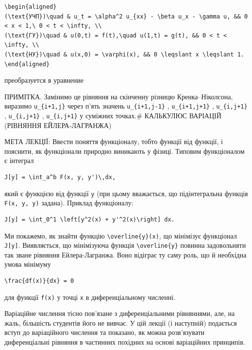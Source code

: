 \documentclass[
  ukrainian,
]{article}
\begin{document}
\begin{verbatim}
\begin{aligned}
(\text{УЧП})\quad & u_t = \alpha^2 u_{xx} - \beta u_x - \gamma u, && 0 < x < 1,\ 0 < t < \infty, \\
(\text{ГУ})\quad & u(0,t) = f(t),\quad u(1,t) = g(t), && 0 < t < \infty, \\
(\text{НУ})\quad & u(x,0) = \varphi(x), && 0 \leqslant x \leqslant 1.
\end{aligned}
\end{verbatim}

преобразуется в уравнение

ПРИМІТКА. Замінимо це рівняння на скінченну різницю Кренка--Ніколсона,
виразимо \texttt{u\_\{i+1,j\}} через п'ять значень
\texttt{u\_\{i+1,j-1\}} , \texttt{u\_\{i+1,j+1\}} ,
\texttt{u\_\{i,j+1\}} , \texttt{u\_\{i,j+1\}} , \texttt{u\_\{i,j+1\}} у
суміжних точках.\# КАЛЬКУЛЮС ВАРІАЦІЙ (РІВНЯННЯ ЕЙЛЕРА-ЛАГРАНЖА)

МЕТА ЛЕКЦІЇ: Ввести поняття функціоналу, тобто функції від функції, і
пояснити, як функціонали природно виникають у фізиці. Типовим
функціоналом є інтеграл

\begin{verbatim}
J[y] = \int_a^b F(x, y, y')\,dx,
\end{verbatim}

який є функцією від функції \texttt{y} (при цьому вважається, що
підінтегральна функція \texttt{F(x,\ y,\ y\textquotesingle{})} задана).
Приклад функціоналу:

\begin{verbatim}
J[y] = \int_0^1 \left[y^2(x) + y'^2(x)\right] dx.
\end{verbatim}

Ми покажемо, як знайти функцію
\texttt{\textbackslash{}overline\{y\}(x)}, що мінімізує функціонал
\texttt{J{[}y{]}}. Виявляється, що мінімізуюча функція
\texttt{\textbackslash{}overline\{y\}} повинна задовольняти так зване
рівняння Ейлера-Лагранжа. Воно відіграє ту саму роль, що й необхідна
умова мінімуму

\begin{verbatim}
\frac{df(x)}{dx} = 0
\end{verbatim}

для функції \texttt{f(x)} у точці \texttt{x} в диференціальному
численні.

Варіаційне числення тісно пов'язане з диференціальними рівняннями, але,
на жаль, більшість студентів його не вивчає. У цій лекції (і наступній)
подається вступ до варіаційного числення та показано, як можна
розв'язувати диференціальні рівняння в частинних похідних на основі
варіаційних принципів.
\end{document}
